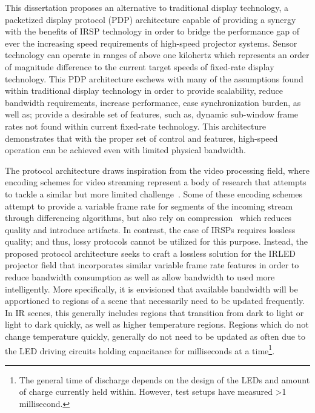 This dissertation proposes an alternative to traditional display technology, a packetized display protocol (PDP) architecture capable of providing a synergy with the benefits of IRSP technology in order to bridge the performance gap of ever the increasing speed requirements of high-speed projector systems. Sensor technology can operate in ranges of above one kilohertz which represents an order of magnitude difference to the current target speeds of fixed-rate display technology. This PDP architecture eschews with many of the assumptions found within traditional display technology in order to provide scalability, reduce bandwidth requirements, increase performance, ease synchronization burden, as well as; provide a desirable set of features, such as, dynamic sub-window frame rates not found within current fixed-rate technology. This architecture demonstrates that with the proper set of control and features, high-speed operation can be achieved even with limited physical bandwidth.

The protocol architecture draws inspiration from the video processing field, where encoding schemes for video streaming represent a body of research that attempts to tackle a similar but more limited challenge~\cite{BakarEtAl2017}. Some of these encoding schemes attempt to provide a variable frame rate for segments of the incoming stream through differencing algorithms, but also rely on compression~\cite{CastilloEtAl2012} which reduces quality and introduce artifacts. In contrast, the case of IRSPs requires lossless quality; and thus, lossy protocols cannot be utilized for this purpose. Instead, the proposed protocol architecture seeks to craft a lossless solution for the IRLED projector field that incorporates similar variable frame rate features in order to reduce bandwidth consumption as well as allow bandwidth to used more intelligently. More specifically, it is envisioned that available bandwidth will be apportioned to regions of a scene that necessarily need to be updated frequently. In IR scenes, this generally includes regions that transition from dark to light or light to dark quickly, as well as higher temperature regions. Regions which do not change temperature quickly, generally do not need to be updated as often due to the LED driving circuits holding capacitance for milliseconds at a time\footnote{The general time of discharge depends on the design of the LEDs and amount of charge currently held within. However, test setups have measured \textgreater1 millisecond.}.

